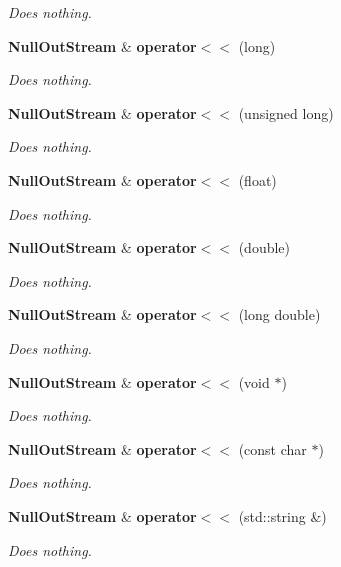 \begin{DoxyCompactItemize}
\begin{DoxyCompactList}\small\item\em Does nothing. \end{DoxyCompactList}\item 
\textbf{ Null\+Out\+Stream} \& \textbf{ operator$<$$<$} (long)
\begin{DoxyCompactList}\small\item\em Does nothing. \end{DoxyCompactList}\item 
\textbf{ Null\+Out\+Stream} \& \textbf{ operator$<$$<$} (unsigned long)
\begin{DoxyCompactList}\small\item\em Does nothing. \end{DoxyCompactList}\item 
\textbf{ Null\+Out\+Stream} \& \textbf{ operator$<$$<$} (float)
\begin{DoxyCompactList}\small\item\em Does nothing. \end{DoxyCompactList}\item 
\textbf{ Null\+Out\+Stream} \& \textbf{ operator$<$$<$} (double)
\begin{DoxyCompactList}\small\item\em Does nothing. \end{DoxyCompactList}\item 
\textbf{ Null\+Out\+Stream} \& \textbf{ operator$<$$<$} (long double)
\begin{DoxyCompactList}\small\item\em Does nothing. \end{DoxyCompactList}\item 
\textbf{ Null\+Out\+Stream} \& \textbf{ operator$<$$<$} (void $\ast$)
\begin{DoxyCompactList}\small\item\em Does nothing. \end{DoxyCompactList}\item 
\textbf{ Null\+Out\+Stream} \& \textbf{ operator$<$$<$} (const char $\ast$)
\begin{DoxyCompactList}\small\item\em Does nothing. \end{DoxyCompactList}\item 
\textbf{ Null\+Out\+Stream} \& \textbf{ operator$<$$<$} (std\+::string \&)
\begin{DoxyCompactList}\small\item\em Does nothing. \end{DoxyCompactList}\item 

\end{DoxyCompactItemize}
